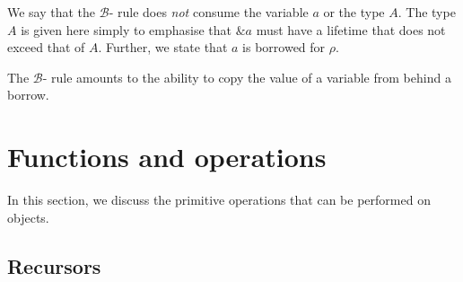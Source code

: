 \documentclass[11pt]{book}
\begin{document}

We say that the $\mathcal B$-\rintro{} rule does \textit{not} consume the variable \( a \) or the type \( A \).
The type \( A \) is given here simply to emphasise that \( \& a \) must have a lifetime that does not exceed that of \( A \).
Further, we state that \( a \) is borrowed for \( \rho \).
The $\mathcal B$-\relim{} rule amounts to the ability to copy the value of a variable from behind a borrow.


\section{Functions and operations}

In this section, we discuss the primitive operations that can be performed on objects.

\subsection{Recursors}
\end{document}
